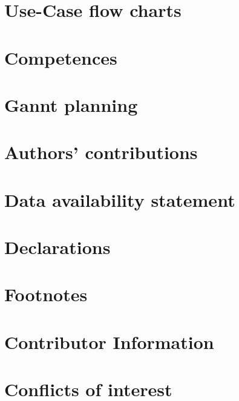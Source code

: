 \documentclass{article}
\begin{document}
		\section{ Use-Case flow charts}
		
		\section{Competences}
		
		\section{ Gannt planning }
		
		\section{Authors' contributions}
		
		\section{Data availability statement}
		
		\section{Declarations}
		
		\section{Footnotes}
		
		\section{Contributor Information}
		
		 
		
	
		\newpage
		\section{Conflicts of interest}
		
		
		
		
		
	
	
	
	\newpage
\end{document}
